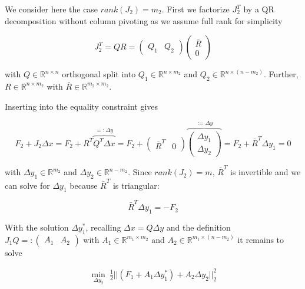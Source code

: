 \documentclass{scrartcl}[12pt, halfparskip]
\numberwithin{equation}{section}
\numberwithin{figure}{section}
\numberwithin{table}{section}
\begin{document}
We consider here the case $rank(J_2)=m_2$. First we factorize $J_2^T$ by a QR decomposition without column pivoting as we assume full rank for simplicity

\begin{equation}
	J_2^T = Q R = 
	\begin{pmatrix}
		Q_1 & Q_2
	\end{pmatrix}
	\begin{pmatrix}
		\bar{R} \\
		0
	\end{pmatrix}
\end{equation}

with $Q \in \mathbb{R}^{n \times n}$ orthogonal split into $Q_1 \in \mathbb{R}^{n \times m_2}$ and $Q_2 \in \mathbb{R}^{n \times (n-m_2)}$. Further, $R \in \mathbb{R}^{n \times m_2}$ with $\bar{R} \in \mathbb{R}^{m_2 \times m_2}$.

Inserting into the equality constraint gives

\begin{equation}
	F_2 + J_2 \Delta x = F_2 + R^T \overbrace{Q^T \Delta x}^{=: \Delta y} = F_2 +
	\begin{pmatrix}
		\bar{R}^T & 0
	\end{pmatrix} 
	\overbrace{
	\begin{pmatrix}
		\Delta y_1 \\
		\Delta y_2
	\end{pmatrix}}^{:= \Delta y} = F_2 + \bar{R}^T \Delta y_1 = 0
\end{equation}

with $\Delta y_1 \in \mathbb{R}^{m_2}$ and $\Delta y_2 \in \mathbb{R}^{n-m_2}$. Since $rank(J_2)=m$, $\bar{R}^T$ is invertible and we can solve for $\Delta y_1$ because $\bar{R}^T$ is triangular:

\begin{equation}
	\bar{R}^T \Delta y_1 = -F_2
\end{equation}

With the solution $\Delta y_1^*$, recalling $\Delta x = Q \Delta y$ and the definition $J_1 Q =: \begin{pmatrix} A_1 & A_2 \end{pmatrix}$ with $A_1 \in \mathbb{R}^{m_1 \times m_2}$ and $A_2 \in \mathbb{R}^{m_1 \times (n-m_2)}$ it remains to solve

\begin{align}
	\min_{\Delta y_2} \ \frac{1}{2} || (F_1 + A_1 \Delta y_1^*) + A_2 \Delta y_2 ||_2^2
\end{align}
\end{document}
